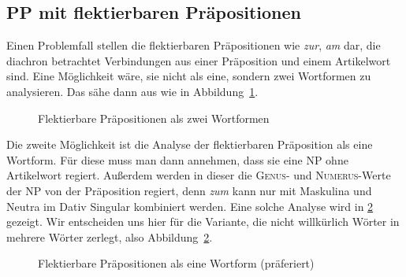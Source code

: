 \subsection{PP mit flektierbaren Präpositionen}

\label{sec:syntaxflektierbareprp}


Einen Problemfall stellen die flektierbaren Präpositionen wie \textit{zur}, \textit{am} dar, die diachron betrachtet Verbindungen aus einer Präposition und einem Artikelwort sind.
Eine Möglichkeit wäre, sie nicht als eine, sondern zwei Wortformen zu analysieren.
Das sähe dann aus wie in Abbildung~\ref{fig:flektprpreanalyse}.

\begin{figure}[!htbp]
  \centering
  \caption{Flektierbare Präpositionen als zwei Wortformen}
  \label{fig:flektprpreanalyse}
\end{figure}

Die zweite Möglichkeit ist die Analyse der flektierbaren Präposition als eine Wortform.
Für diese muss man dann annehmen, dass sie eine NP ohne Artikelwort regiert.
Außerdem werden in dieser die \textsc{Genus}- und \textsc{Numerus}-Werte der NP von der Präposition regiert, denn \textit{zum} kann \zB nur mit Maskulina und Neutra im Dativ Singular kombiniert werden.
Eine solche Analyse wird in \ref{fig:flektprpalswortform} gezeigt.
Wir entscheiden uns hier für die Variante, die nicht willkürlich Wörter in mehrere Wörter zerlegt, also Abbildung~\ref{fig:flektprpalswortform}.

\begin{figure}[!htbp]
  \centering
  \caption{Flektierbare Präpositionen als eine Wortform (präferiert)}
  \label{fig:flektprpalswortform}
\end{figure}




